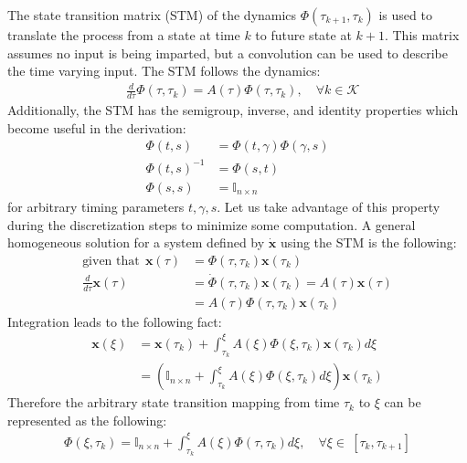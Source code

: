 \documentclass[conf]{new-aiaa}
\begin{document}
The state transition matrix (STM) of the dynamics $\Phi(\tau_{k+1},\tau_k)$ is used to translate the process from a state at time $k$ to future state at $k+1$. This matrix assumes no input is being imparted, but a convolution can be used to describe the time varying input. The STM follows the dynamics:
%
\begin{align}
& \frac{d}{d\tau} \Phi(\tau,\tau_k) = A(\tau) \Phi(\tau,\tau_k), \quad \forall k \in \mathcal{K}
\end{align}
Additionally, the STM has the semigroup, inverse, and identity properties which become useful in the derivation:
\begin{align}
	\Phi(t,s) &= \Phi(t, \gamma)\Phi(\gamma, s) \\
	\Phi(t,s)^{-1} &= \Phi(s,t) \\
	\Phi(s,s) &= \mathbb{I}_{n \times n}
\end{align}
for arbitrary timing parameters $t, \gamma, s$. Let us take advantage of this property during the discretization steps to minimize some computation. A general homogeneous solution for a system defined by $\dot{\mathbf{x}}$ using the STM is the following:
%
\begin{align}
	\text{given that} \ \ \mathbf{x}(\tau) &= \Phi(\tau, \tau_k) \mathbf{x}(\tau_k)\\
	\frac{d}{d\tau}\mathbf{x}(\tau) &= \dot{\Phi}(\tau, \tau_k) \mathbf{x}(\tau_k) = A(\tau)\mathbf{x}(\tau) \\ 
	& = A(\tau) \Phi(\tau, \tau_k) \mathbf{x}(\tau_k)
\end{align}
Integration leads to the following fact:
\begin{align}
	\mathbf{x}(\xi) &= \mathbf{x}(\tau_k) + \int_{\tau_k}^\xi A(\xi) \Phi(\xi, \tau_k) \mathbf{x}(\tau_k) d\xi \\
	&= \left( \mathbb{I}_{n\times n} + \int_{\tau_k}^\xi A(\xi) \Phi(\xi, \tau_k) d\xi \right)  \mathbf{x}(\tau_k)
\end{align}
Therefore the arbitrary state transition mapping from time $\tau_k$ to $\xi$ can be represented as the following:
\begin{align}
	\Phi(\xi, \tau_k) = \mathbb{I}_{n\times n} + \int_{\tau_k}^\xi A(\xi) \Phi(\tau, \tau_k) d\xi, \quad \forall \xi \in \ [\tau_k, \tau_{k+1}]
\end{align}
\end{document}
